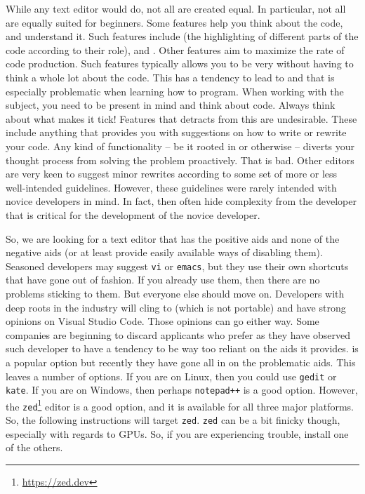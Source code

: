 While any text editor would do, not all are created equal. In particular, not all are equally suited for beginners. Some features help you think about the code, and understand it. Such features include  (the highlighting of different parts of the code according to their role),  and . Other features aim to maximize the rate of code production. Such features typically allows you to be very  without having to think a whole lot about the code. This has a tendency to lead to  and that is especially problematic when learning how to program. When working with the subject, you need to be present in mind and think about code. Always think about what makes it tick! Features that detracts from this are undesirable. These include anything that provides you with suggestions on how to write or rewrite your code. Any kind of  functionality -- be it rooted in  or otherwise -- diverts your thought process from solving the problem proactively. That is bad. Other editors are very keen to suggest minor rewrites according to some set of more or less well-intended guidelines. However, these guidelines were rarely intended with novice developers in mind. In fact, then often hide complexity from the developer that is critical for the development of the novice developer.

So, we are looking for a text editor that has the positive aids and none of the negative aids (or at least provide easily available ways of disabling them). Seasoned developers may suggest \texttt{vi} or \texttt{emacs}, but they use their own shortcuts that have gone out of fashion. If you already use them, then there are no problems sticking to them. But everyone else should move on. Developers with deep roots in the industry will cling to  (which is not portable) and have strong opinions on Visual Studio Code. Those opinions can go either way. Some companies are beginning to discard applicants who prefer  as they have observed such developer to have a tendency to be way too reliant on the aids it provides.  is a popular option but recently they have gone all in on the problematic aids. This leaves a number of options. If you are on Linux, then you could use \texttt{gedit} or \texttt{kate}. If you are on Windows, then perhaps \texttt{notepad++} is a good option. However, the \texttt{zed}\footnote{\url{https://zed.dev}} editor is a good option, and it is available for all three major platforms. So, the following instructions will target \texttt{zed}. \texttt{zed} can be a bit finicky though, especially with regards to GPUs. So, if you are experiencing trouble, install one of the others.

